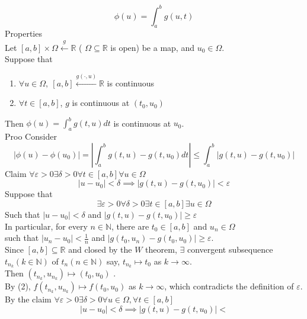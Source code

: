 \documentclass[../main.tex]{subfiles}
\begin{document}
\begin{enumerate}
\begin{equation}
\phi(u) = \int_a^b g(u,t)
\end{equation}
Properties\\
Let $[a,b] \times \Omega \xleftarrow{g} \mathbb{R}$ ( $\Omega \subseteq \mathbb{R}$ is open) 
be a map, and $u_0 \in \Omega$.\\
Suppose that
\begin{enumerate}
  \item $\forall u \in \Omega,~[a,b]\xleftarrow{g(\cdot, u)} \mathbb{R}$ is continuous
  \item $\forall t \in [a,b]$, $g$ is continuous at $(t_0,u_0)$
\end{enumerate}
Then $\phi(u) = \int_a^b g(t,u)dt$ is continuous at $u_0$.\\
Proo
Consider
\begin{equation}
\left| \phi(u) - \phi(u_0) \right| = \left| \int_a^b g(t,u) - g(t,u_0)dt \right| \leq \int_a^b
\left|
g(t,u) - g(t,u_0)
\right|
\end{equation}
Claim $\forall \varepsilon > 0 \exists \delta > 0 \forall t \in [a,b]\forall u \in \Omega$
\begin{equation}
\left| u - u_0 \right| < \delta \implies \left| g(t,u) - g(t,u_0) \right| < \varepsilon  
\end{equation}
Suppose that
\begin{equation}
\exists \varepsilon >0 \forall \delta > 0 \exists t \in [a,b] \exists u \in \Omega
\end{equation}
Such that $\left| u - u_0 \right| < \delta$ and $\left| g(t,u) - g(t,u_0) \right| \geq \varepsilon$\\
In particular, for every $n \in \mathbb{N}$, there are $t_0 \in [a,b]$ and $u_n \in \Omega$ \\
such that $\left| u_n - u_0 \right| < \frac{1}{n}$ and 
$\left| g(t_0,u_n) - g(t_0,u_0) \right| \geq \varepsilon$.\\
Since $[a,b] \subseteq \mathbb{R}$ and closed by the $W$ theorem, $\exists$ convergent subsequence $t_{n_k}(k\in \mathbb{N})$
of $t_n(n \in \mathbb{N})$ say, $t_{n_k} \mapsto t_0$ as $k \to \infty$.\\
Then $(t_{n_k},u_{n_k}) \mapsto (t_0,u_0)$ .\\
By (2), $f(t_{n_k},u_{n_k}) \mapsto f(t_0,u_0)$ as $k \to \infty$, which contradicts the definition of $\varepsilon$.\\
By the claim $\forall \varepsilon > 0 \exists \delta > 0 \forall u \in \Omega, \forall t \in [a,b]$
\begin{equation}
\left| u - u_0 \right| < \delta \implies \left| g(t,u) - g(t,u_0) \right| <

\end{equation}
\end{enumerate}
\end{document}
